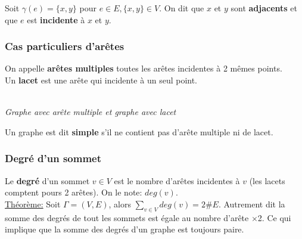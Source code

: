 \documentclass[11pt]{article}
\begin{document}
			Soit $\gamma(e)=\{x,y\}$ pour $e \in E, \{x, y\} \in V$. On dit que $x$ et $y$ sont \textbf{adjacents} et que $e$ est \textbf{incidente} à $x$ et $y$. \\
		
		\subsubsection{Cas particuliers d'arêtes}
			On appelle \textbf{arêtes multiples} toutes les arêtes incidentes à 2 mêmes points.\\
			Un \textbf{lacet} est une arête qui incidente à un seul point.
			\begin{center}
			 \\
			\textit{Graphe avec arête multiple et graphe avec lacet} \\
			\end{center}
		Un graphe est dit \textbf{simple} s'il ne contient pas d'arête multiple ni de lacet.
		
		\subsubsection{Degré d'un sommet}
			Le \textbf{degré} d'un sommet $v \in V$ est le nombre d'arêtes incidentes à $v$ (les lacets comptent pours 2 arêtes). On le note: $deg(v)$.\\
			
			\underline{Théorème:} Soit $\Gamma = (V,E)$, alors $\displaystyle \sum_{v \in V} deg(v) = 2\# E$. Autrement dit la somme des degrés de tout les sommets est égale au nombre d'arête $\times$2. Ce qui implique que la somme des degrés d'un graphe est toujours paire.\\
			
\end{document}
